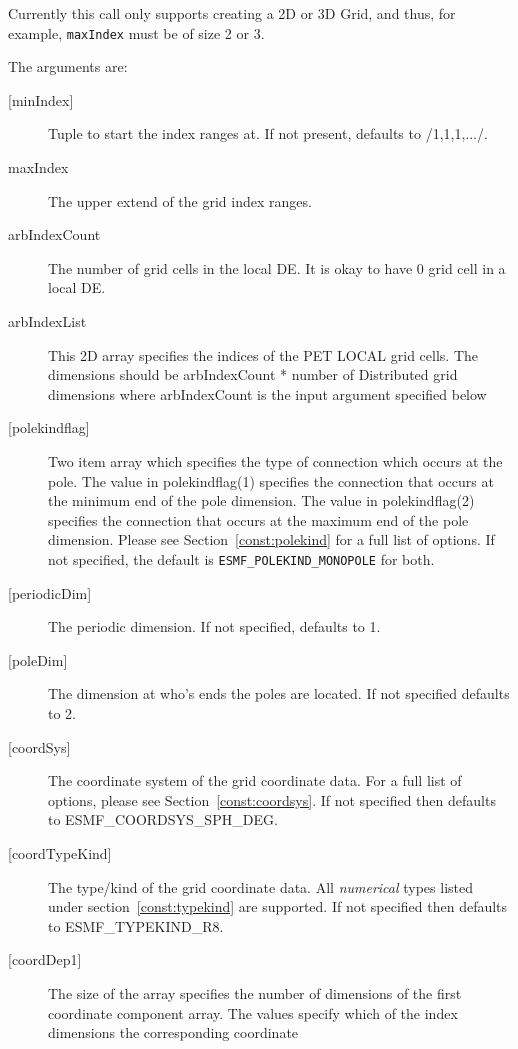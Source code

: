    Currently this call
   only supports creating a 2D or 3D Grid, and thus, for example, {\tt maxIndex} must be of size 2 or 3.
  
  
   The arguments are:
   \begin{description}
   \item[{[minIndex]}]
        Tuple to start the index ranges at. If not present, defaults
        to /1,1,1,.../.
   \item[maxIndex]
        The upper extend of the grid index ranges.
   \item[arbIndexCount]
        The number of grid cells in the local DE. It is okay to have 0
        grid cell in a local DE.
   \item[arbIndexList]
        This 2D array specifies the indices of the PET LOCAL grid cells.  The
        dimensions should be arbIndexCount * number of Distributed grid dimensions
        where arbIndexCount is the input argument specified below
   \item[{[polekindflag]}]
        Two item array which specifies the type of connection which occurs at the pole. The value in polekindflag(1)
        specifies the connection that occurs at the minimum end of the pole dimension. The value in polekindflag(2)
        specifies the connection that occurs at the maximum end of the pole dimension. Please see
        Section~\ref{const:polekind} for a full list of options. If not specified,
        the default is {\tt ESMF\_POLEKIND\_MONOPOLE} for both.
   \item[{[periodicDim]}]
        The periodic dimension. If not specified, defaults to 1.
   \item[{[poleDim]}]
        The dimension at who's ends the poles are located. If not specified defaults to 2.
   \item[{[coordSys]}]
       The coordinate system of the grid coordinate data.
       For a full list of options, please see Section~\ref{const:coordsys}.
       If not specified then defaults to ESMF\_COORDSYS\_SPH\_DEG.
   \item[{[coordTypeKind]}]
       The type/kind of the grid coordinate data. All {\em numerical} types
       listed under section~\ref{const:typekind} are supported.
       If not specified then defaults to ESMF\_TYPEKIND\_R8.
   \item[{[coordDep1]}]
       The size of the array specifies the number of dimensions of the
       first coordinate component array. The values specify which
       of the index dimensions the corresponding coordinate

\end{description}
